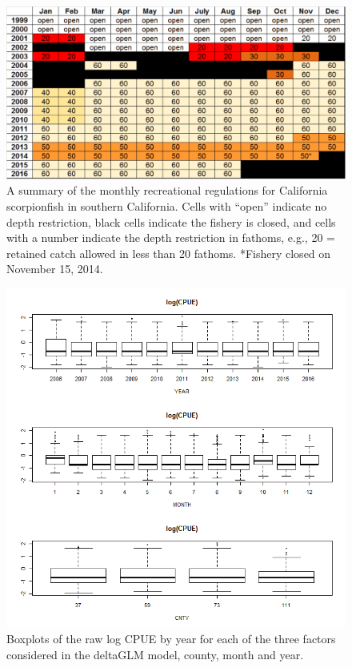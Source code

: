 \documentclass[12pt,]{article}
\begin{document}
\begin{figure}[htbp]
\centering
\includegraphics{Figures/Rec_regs.pdf}
\caption{A summary of the monthly recreational regulations for
California scorpionfish in southern California. Cells with ``open''
indicate no depth restriction, black cells indicate the fishery is
closed, and cells with a number indicate the depth restriction in
fathoms, e.g., 20 = retained catch allowed in less than 20 fathoms.
*Fishery closed on November 15, 2014. \label{fig:recregs}}
\end{figure}

\begin{figure}[htbp]
\centering
\includegraphics{Figures/Fleet4_RecPR_dockside_lograwCPUE.png}
\caption{Boxplots of the raw log CPUE by year for each of the three
factors considered in the deltaGLM model, county, month and year.
\label{fig:Fleet4_RecPR_dockside_lograwCPUE}}
\end{figure}
\end{document}
